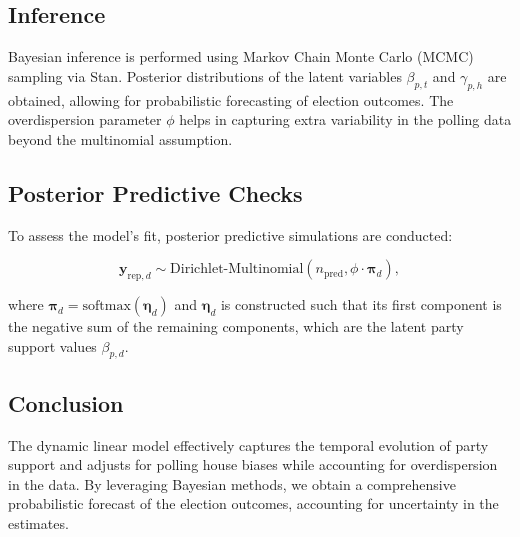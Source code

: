 \documentclass[
  letterpaper,
  DIV=11,
  numbers=noendperiod]{scrartcl}
\begin{document}
\subsection{Inference}\label{inference}

Bayesian inference is performed using Markov Chain Monte Carlo (MCMC)
sampling via Stan. Posterior distributions of the latent variables
\(\beta_{p,t}\) and \(\gamma_{p,h}\) are obtained, allowing for
probabilistic forecasting of election outcomes. The overdispersion
parameter \(\phi\) helps in capturing extra variability in the polling
data beyond the multinomial assumption.

\subsection{Posterior Predictive
Checks}\label{posterior-predictive-checks}

To assess the model's fit, posterior predictive simulations are
conducted:

\[
\mathbf{y}_{\text{rep},d} \sim \text{Dirichlet-Multinomial}\left(n_{\text{pred}}, \phi \cdot \boldsymbol{\pi}_{d}\right),
\]

where
\(\boldsymbol{\pi}_{d} = \text{softmax}\left(\boldsymbol{\eta}_{d}\right)\)
and \(\boldsymbol{\eta}_{d}\) is constructed such that its first
component is the negative sum of the remaining components, which are the
latent party support values \(\beta_{p,d}\).

\subsection{Conclusion}\label{conclusion}

The dynamic linear model effectively captures the temporal evolution of
party support and adjusts for polling house biases while accounting for
overdispersion in the data. By leveraging Bayesian methods, we obtain a
comprehensive probabilistic forecast of the election outcomes,
accounting for uncertainty in the estimates.
\end{document}
